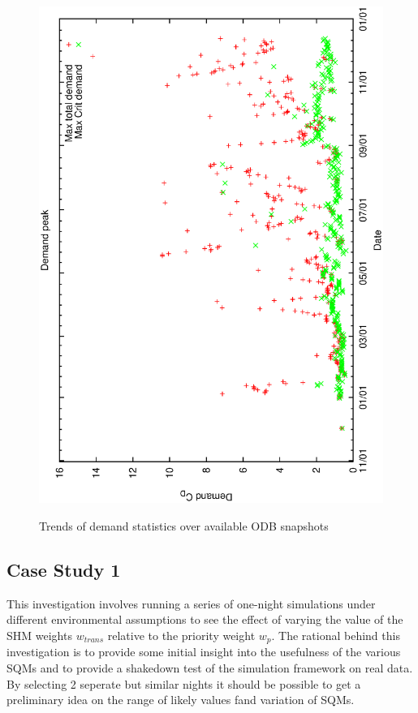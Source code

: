 \begin{figure}[h]
\begin{center}
{   \includegraphics[scale=0.25, angle=-90]{figures/cdmax.eps}
   \label{fig:cd_max_trend}
 }
\caption{Trends of demand statistics over available ODB snapshots}
\end{center}
\end{figure}


\subsection{Case Study 1}
This investigation involves running a series of one-night simulations under different environmental assumptions to see the effect of varying the value of the SHM weights $w_{trans}$ relative to the priority weight $w_p$.
The rational behind this investigation is to provide some initial insight into the usefulness of the various SQMs and to provide a shakedown test of the simulation framework on real data. By selecting 2 seperate but similar nights it should be possible to get a preliminary idea on the range of likely values fand variation of SQMs.


